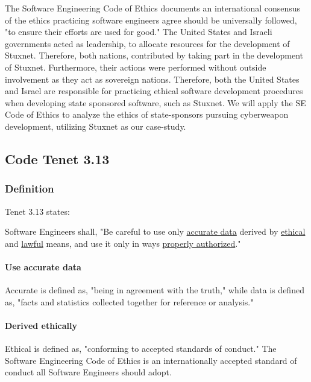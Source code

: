 \documentclass[12pt]{article}
\begin{document}
\begin{multicols}{2}
The Software Engineering Code of Ethics documents an international consensus of the ethics practicing software engineers agree should be universally followed, "to ensure their efforts are used for good."\cite{softwareEngineeringCodeOfEthics} The United States and Israeli governments acted as leadership, to allocate resources for the development of Stuxnet. Therefore, both nations, contributed by taking part in the development of Stuxnet. Furthermore, their actions were performed without outside involvement as they act as sovereign nations. Therefore, both the United States and Israel are responsible for practicing ethical software development procedures when developing state sponsored software, such as Stuxnet. We will apply the SE Code of Ethics to analyze the ethics of state-sponsors pursuing cyberweapon development, utilizing Stuxnet as our case-study.


\subsection{Code Tenet 3.13}

\subsubsection{Definition}

Tenet 3.13  states:
\begin{framed}
Software Engineers shall, "Be careful to use only \ul{accurate data} derived by \ul{ethical} and \ul{lawful} means, and use it only in ways \ul{properly authorized}."\cite{softwareEngineeringCodeOfEthics}
\end{framed}

\paragraph{Use accurate data}
Accurate is defined as, "being in agreement with the truth," while data is defined as, "facts and statistics collected together for reference or analysis."\cite{accurateDefinition}\cite{dataDefinition}

\paragraph{Derived ethically}
Ethical is defined as, "conforming to accepted standards of conduct."\cite{ethicalDefinition} The Software Engineering Code of Ethics is an internationally accepted standard of conduct all Software Engineers should adopt.


\end{multicols}
\end{document}
